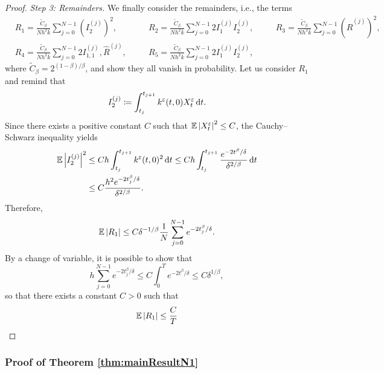 \documentclass[10pt]{article}
\begin{document}
\begin{proof}
\textit{Step 3: Remainders.} We finally consider the remainders, i.e., the terms
\begin{equation}
\begin{alignedat}{3}
	&R_1 = \frac{\widetilde C_\beta}{Nh^2\bar k} \sum_{j=0}^{N-1} \left(I_2^{(j)}\right)^2, \quad &&R_2 = \frac{\widetilde C_\beta}{Nh^2\bar k} \sum_{j=0}^{N-1} 2I_1^{(j)}I_2^{(j)}, \quad &&R_3 = \frac{\widetilde C_\beta}{Nh^2\bar k} \sum_{j=0}^{N-1} \left(\widehat R^{(j)}\right)^2, \\
	&R_4 = \frac{\widetilde C_\beta}{Nh^2\bar k} \sum_{j=0}^{N-1}2 I_{1,1}^{(j)}, \widehat R^{(j)}, \quad &&R_5 = \frac{\widetilde C_\beta}{Nh^2\bar k} \sum_{j=0}^{N-1}2I_1^{(j)}I_2^{(j)}, 
\end{alignedat}
\end{equation}
where $\widetilde C_\beta = 2^{(1-\beta)/\beta}$, and show they all vanish in probability. Let us consider $R_1$ and remind that
\begin{equation}
	I_2^{(j)} \coloneqq \int_{t_j}^{t_{j+1}} k^\varepsilon(t, 0) X^\varepsilon_t \,\mathrm{d} t.
\end{equation}
Since there exists a positive constant $C$ such that $\operatorname{\mathbb{E}}\left\lvert X_t^\varepsilon\right\rvert^2 \leq C$, the Cauchy--Schwarz inequality yields
\begin{equation}
\begin{aligned}
	\operatorname{\mathbb{E}}\left\lvert I_2^{(j)}\right\rvert^2 &\leq Ch \int_{t_j}^{t_{j+1}} k^\varepsilon(t, 0)^2 \,\mathrm{d} t \leq Ch \int_{t_j}^{t_{j+1}} \frac{e^{-2t^\beta/\delta}}{\delta^{2/\beta}}  \,\mathrm{d} t\\
	&\leq C\frac{h^2e^{-2t_j^\beta / \delta}}{\delta^{2/\beta}}.
\end{aligned}
\end{equation}
Therefore,
\begin{equation}
	\operatorname{\mathbb{E}}\left\lvert R_1\right\rvert \leq C \delta^{-1/\beta} \frac1N \sum_{j=0}^{N-1} e^{-2t_j^\beta / \delta}.
\end{equation}
By a change of variable, it is possible to show that
\begin{equation}
	h\sum_{j=0}^{N-1} e^{-2t_j^\beta / \delta} \leq C \int_0^T e^{-2t^\beta/\delta} \leq C \delta^{1/\beta},
\end{equation}
so that there exists a constant $C > 0$ such that
\begin{equation}
	\operatorname{\mathbb{E}}\left\lvert R_1\right\rvert \leq \frac{C}{T}
\end{equation}
\end{proof}

\subsubsection{Proof of Theorem \ref{thm:mainResultN1}}
\end{document}
